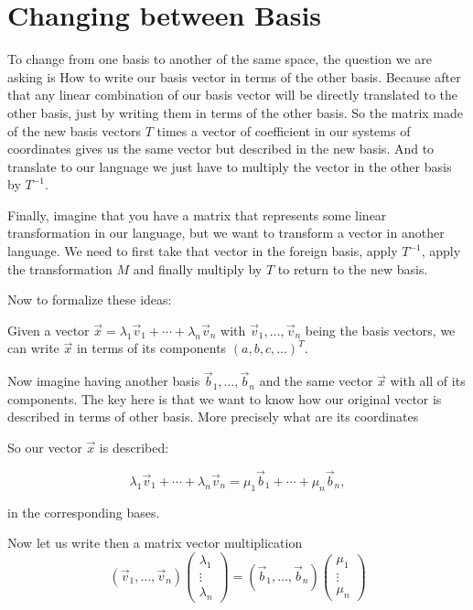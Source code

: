 \newpage
\section{Changing between Basis}

To change from one basis to another of the same space, the question we are asking is How to write our basis vector 
in terms of the other basis. Because after that any linear combination of our basis vector will be directly translated 
to the other basis, just by writing them in terms of the other basis. So the matrix made of the new basis vectors 
\(T\) times a vector of coefficient in our systems of coordinates gives us the same vector but described in the new basis.
And to translate to our language we just have to multiply the vector in the other basis by \(T^{-1}\).
\vspace{\baselineskip}

Finally, imagine that you have a matrix that represents some linear transformation in our language, but we want to transform 
a vector in another language. We need to first take that vector in the foreign basis, apply \(T^{-1}\), apply the transformation \(M\) 
and finally multiply by \(T\) to return to the new basis.
\vspace{\baselineskip}

Now to formalize these ideas:
\vspace{\baselineskip}

Given a vector \(\vec{x} = \lambda_1 \vec{v}_1 + \cdots + \lambda_n \vec{v}_n\) 
with \(\vec{v}_1, \dots, \vec{v}_n\)
being the basis vectors, we can write \(\vec{x}\) in terms of its components \({(a, b, c, \dots)}^T\).
\vspace{\baselineskip}

Now imagine having another basis \(\vec{b}_1, \dots, \vec{b}_n\) and the same vector \(\vec{x}\)
with all of its components. The key here is that we want to know how our original
vector is described in terms of other basis. More precisely what are its coordinates
\vspace{\baselineskip}

So our vector \(\vec{x}\) is described:

\[\lambda_1 \vec{v}_1 + \cdots + \lambda_n \vec{v}_n = \mu_1 \vec{b}_1 + \cdots + \mu_n \vec{b}_n,\]

in the corresponding bases.
\vspace{\baselineskip}

Now let us write then a matrix vector multiplication
\[
(\vec{v}_1, \dots, \vec{v}_ n) 
\begin{pmatrix} \lambda_1 \\ \vdots \\ \lambda_n \end{pmatrix}
 =
(\vec{b}_1, \dots, \vec{b}_ n) 
\begin{pmatrix} \mu_1 \\ \vdots \\ \mu_n \end{pmatrix}
\]


